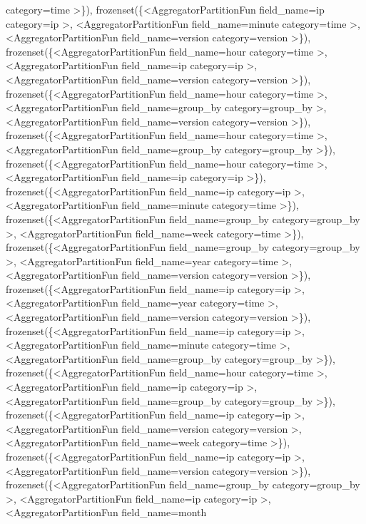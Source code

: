\documentclass[letterpaper,10pt,english]{sphinxmanual}
\begin{document}
\begin{fulllineitems}
\begin{fulllineitems}
category=time \textgreater{}\}), frozenset(\{\textless{}AggregatorPartitionFun field\_name=ip category=ip \textgreater{}, \textless{}AggregatorPartitionFun field\_name=minute category=time \textgreater{}, \textless{}AggregatorPartitionFun field\_name=version category=version \textgreater{}\}), frozenset(\{\textless{}AggregatorPartitionFun field\_name=hour category=time \textgreater{}, \textless{}AggregatorPartitionFun field\_name=ip category=ip \textgreater{}, \textless{}AggregatorPartitionFun field\_name=version category=version \textgreater{}\}), frozenset(\{\textless{}AggregatorPartitionFun field\_name=hour category=time \textgreater{}, \textless{}AggregatorPartitionFun field\_name=group\_by category=group\_by \textgreater{}, \textless{}AggregatorPartitionFun field\_name=version category=version \textgreater{}\}), frozenset(\{\textless{}AggregatorPartitionFun field\_name=hour category=time \textgreater{}, \textless{}AggregatorPartitionFun field\_name=group\_by category=group\_by \textgreater{}\}), frozenset(\{\textless{}AggregatorPartitionFun field\_name=hour category=time \textgreater{}, \textless{}AggregatorPartitionFun field\_name=ip category=ip \textgreater{}\}), frozenset(\{\textless{}AggregatorPartitionFun field\_name=ip category=ip \textgreater{}, \textless{}AggregatorPartitionFun field\_name=minute category=time \textgreater{}\}), frozenset(\{\textless{}AggregatorPartitionFun field\_name=group\_by category=group\_by \textgreater{}, \textless{}AggregatorPartitionFun field\_name=week category=time \textgreater{}\}), frozenset(\{\textless{}AggregatorPartitionFun field\_name=group\_by category=group\_by \textgreater{}, \textless{}AggregatorPartitionFun field\_name=year category=time \textgreater{}, \textless{}AggregatorPartitionFun field\_name=version category=version \textgreater{}\}), frozenset(\{\textless{}AggregatorPartitionFun field\_name=ip category=ip \textgreater{}, \textless{}AggregatorPartitionFun field\_name=year category=time \textgreater{}, \textless{}AggregatorPartitionFun field\_name=version category=version \textgreater{}\}), frozenset(\{\textless{}AggregatorPartitionFun field\_name=ip category=ip \textgreater{}, \textless{}AggregatorPartitionFun field\_name=minute category=time \textgreater{}, \textless{}AggregatorPartitionFun field\_name=group\_by category=group\_by \textgreater{}\}), frozenset(\{\textless{}AggregatorPartitionFun field\_name=hour category=time \textgreater{}, \textless{}AggregatorPartitionFun field\_name=ip category=ip \textgreater{}, \textless{}AggregatorPartitionFun field\_name=group\_by category=group\_by \textgreater{}\}), frozenset(\{\textless{}AggregatorPartitionFun field\_name=ip category=ip \textgreater{}, \textless{}AggregatorPartitionFun field\_name=version category=version \textgreater{}, \textless{}AggregatorPartitionFun field\_name=week category=time \textgreater{}\}), frozenset(\{\textless{}AggregatorPartitionFun field\_name=ip category=ip \textgreater{}, \textless{}AggregatorPartitionFun field\_name=version category=version \textgreater{}\}), frozenset(\{\textless{}AggregatorPartitionFun field\_name=group\_by category=group\_by \textgreater{}, \textless{}AggregatorPartitionFun field\_name=ip category=ip \textgreater{}, \textless{}AggregatorPartitionFun field\_name=month 
\end{fulllineitems}
\end{fulllineitems}
\end{document}
